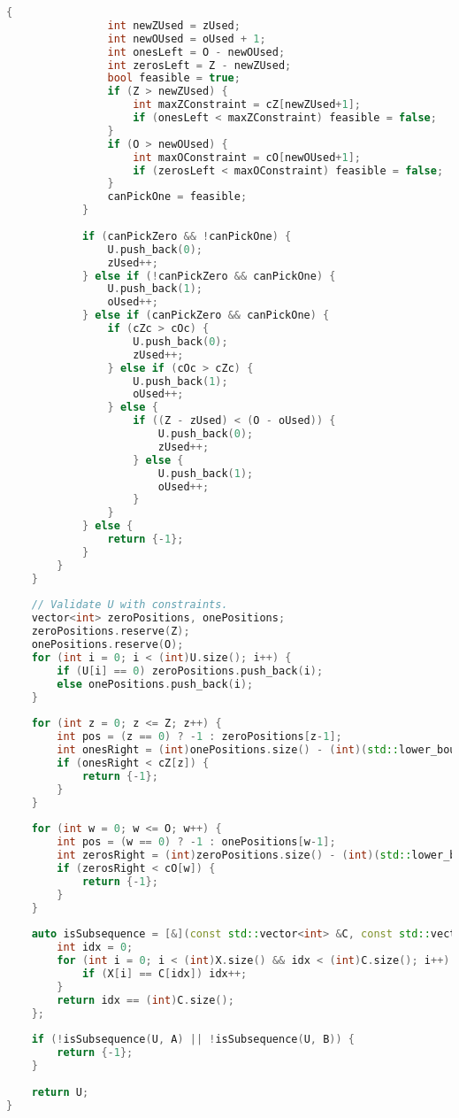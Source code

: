 \begin{lstlisting}[language=C++]
            {
                int newZUsed = zUsed;
                int newOUsed = oUsed + 1;
                int onesLeft = O - newOUsed;
                int zerosLeft = Z - newZUsed;
                bool feasible = true;
                if (Z > newZUsed) {
                    int maxZConstraint = cZ[newZUsed+1];
                    if (onesLeft < maxZConstraint) feasible = false;
                }
                if (O > newOUsed) {
                    int maxOConstraint = cO[newOUsed+1];
                    if (zerosLeft < maxOConstraint) feasible = false;
                }
                canPickOne = feasible;
            }
 
            if (canPickZero && !canPickOne) {
                U.push_back(0);
                zUsed++;
            } else if (!canPickZero && canPickOne) {
                U.push_back(1);
                oUsed++;
            } else if (canPickZero && canPickOne) {
                if (cZc > cOc) {
                    U.push_back(0);
                    zUsed++;
                } else if (cOc > cZc) {
                    U.push_back(1);
                    oUsed++;
                } else {
                    if ((Z - zUsed) < (O - oUsed)) {
                        U.push_back(0);
                        zUsed++;
                    } else {
                        U.push_back(1);
                        oUsed++;
                    }
                }
            } else {
                return {-1};
            }
        }
    }
 
    // Validate U with constraints.
    vector<int> zeroPositions, onePositions;
    zeroPositions.reserve(Z);
    onePositions.reserve(O);
    for (int i = 0; i < (int)U.size(); i++) {
        if (U[i] == 0) zeroPositions.push_back(i);
        else onePositions.push_back(i);
    }
 
    for (int z = 0; z <= Z; z++) {
        int pos = (z == 0) ? -1 : zeroPositions[z-1];
        int onesRight = (int)onePositions.size() - (int)(std::lower_bound(onePositions.begin(), onePositions.end(), pos+1) - onePositions.begin());
        if (onesRight < cZ[z]) {
            return {-1};
        }
    }
 
    for (int w = 0; w <= O; w++) {
        int pos = (w == 0) ? -1 : onePositions[w-1];
        int zerosRight = (int)zeroPositions.size() - (int)(std::lower_bound(zeroPositions.begin(), zeroPositions.end(), pos+1) - zeroPositions.begin());
        if (zerosRight < cO[w]) {
            return {-1};
        }
    }
 
    auto isSubsequence = [&](const std::vector<int> &C, const std::vector<int> &X) {
        int idx = 0;
        for (int i = 0; i < (int)X.size() && idx < (int)C.size(); i++) {
            if (X[i] == C[idx]) idx++;
        }
        return idx == (int)C.size();
    };
 
    if (!isSubsequence(U, A) || !isSubsequence(U, B)) {
        return {-1};
    }
 
    return U;
}
\end{lstlisting}
